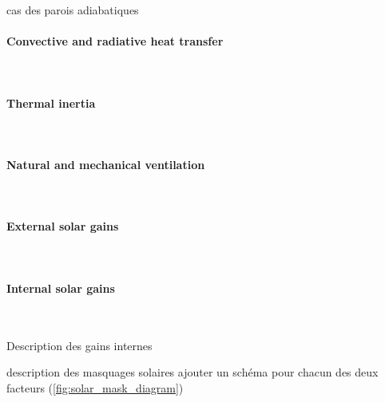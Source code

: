 \documentclass[11pt]{article}
\begin{document}
            cas des parois adiabatiques


            \paragraph{Convective and radiative heat transfer}\mbox{}\\ %
            \label{par:convective_and_radiative_heat_transfer}
            

            \paragraph{Thermal inertia}\mbox{}\\ %
            \label{par:thermal_inertia}
            

            \paragraph{Natural and mechanical ventilation}\mbox{}\\ %
            \label{par:natural_and_mechanical_ventilation}
            

            \paragraph{External solar gains}\mbox{}\\ %
            \label{par:external_solar_gains}
            


            \paragraph{Internal solar gains}\mbox{}\\ %
            \label{par:internal_solar_gains}

            Description des gains internes 

            description des masquages solaires
            ajouter un schéma pour chacun des deux facteurs (\ref{fig:solar_mask_diagram})
\end{document}
